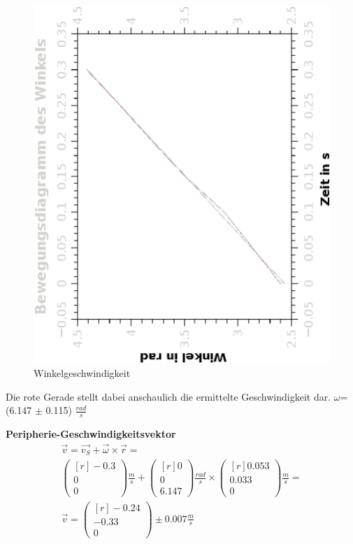 \documentclass{article}
\begin{document}
\begin{figure}[H]
\caption{Winkelgeschwindigkeit}
\begin{center}
\includegraphics[scale=0.7,angle=-90]{winkelgeschw.eps}
\end{center}
\end{figure}
Die rote Gerade stellt dabei anschaulich die ermittelte Geschwindigkeit dar. 
$\omega$= (6.147 $\pm$ 0.115) $\frac{rad}{s}$

\textbf{Peripherie-Geschwindigkeitsvektor}
\begin{gather*}
\vec{v}=\vec{v_S}+\vec{\omega}\times \vec{r} =\\
\begin{pmatrix*}[r]
-0.3 \\ 0 \\ 0
\end{pmatrix*}\frac{m}{s}
+ \begin{pmatrix*}[r]
0 \\ 0 \\ 6.147	
\end{pmatrix*}\frac{rad}{s}
\times
\begin{pmatrix*}[r]
0.053 \\ 0.033 \\ 0	
\end{pmatrix*}\frac{m}{s}
=
\\
\vec{v}=\begin{pmatrix*}[r]
-0.24 \\ -0.33 \\ 0	
\end{pmatrix*} \pm 0.007 \frac{m}{s}
\end{gather*}
\end{document}
